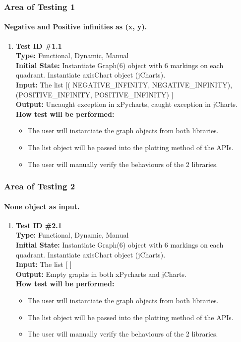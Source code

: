 \documentclass[12pt, titlepage]{article}
\begin{document}
\subsubsection{Area of Testing 1}		
	\paragraph{Negative and Positive infinities as (x, y).}
		\begin{enumerate}
			\item{\textbf{Test ID \#1.1\\}}
			\textbf{Type:} Functional, Dynamic, Manual\\
			\textbf{Initial State:} Instantiate Graph(6) object with 6 markings on each quadrant. Instantiate axisChart object (jCharts).\\	
			\textbf{Input:} The list [( NEGATIVE\_INFINITY, NEGATIVE\_INFINITY),  (POSITIVE\_INFINITY, POSITIVE\_INFINITY) ]\\
			\textbf{Output:}  Uncaught exception in xPycharts, caught exception in jCharts.\\
			\textbf{How test will be performed:}
				\begin{itemize}[label={--}]
					\item The user will instantiate the graph objects from both libraries. 
					\item The list object will be passed into the plotting method of the APIs.
					\item The user will manually verify the behaviours of the 2 libraries.
				\end{itemize}					
	\end{enumerate}

\subsubsection{Area of Testing 2}		
	\paragraph{None object as input.}
		\begin{enumerate}
			\item{\textbf{Test ID \#2.1\\}}
			\textbf{Type:} Functional, Dynamic, Manual\\
			\textbf{Initial State:} Instantiate Graph(6) object with 6 markings on each quadrant. Instantiate axisChart object (jCharts).\\	
			\textbf{Input:} The list [ ]\\
			\textbf{Output:}  Empty graphs in both xPycharts and jCharts.\\
			\textbf{How test will be performed:}
				\begin{itemize}[label={--}]
					\item The user will instantiate the graph objects from both libraries. 
					\item The list object will be passed into the plotting method of the APIs.
					\item The user will manually verify the behaviours of the 2 libraries.
				\end{itemize}					
	\end{enumerate}
	
\end{document}
